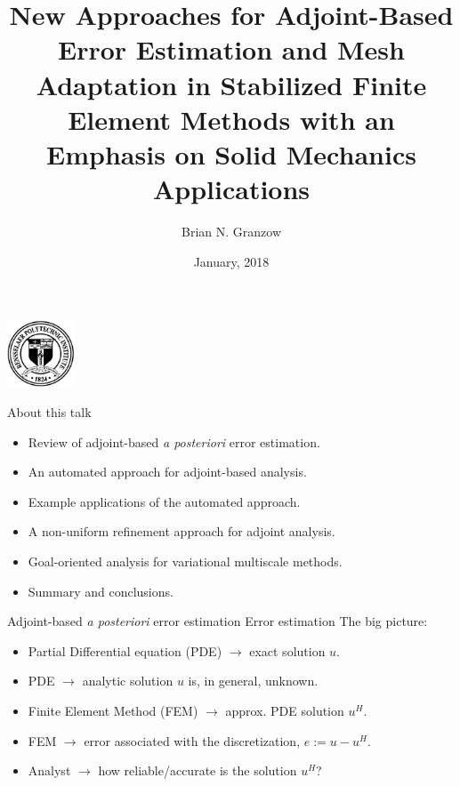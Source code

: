 \documentclass[fleqn]{beamer}
\title{New Approaches for Adjoint-Based
Error Estimation and Mesh Adaptation in
Stabilized Finite Element Methods with an
Emphasis on Solid Mechanics Applications}
\date{January, 2018}
\author{Brian N. Granzow}
\institute{
Mechanical Engineering\\
Rensselaer Polytechnic Instutite\\
Troy, NY 12180 USA}
\begin{document}
\beamertemplatenavigationsymbolsempty


\begin{frame}
\titlepage
\begin{center}
\includegraphics[width=0.15\textwidth]{../img/rpi_seal}
\end{center}
\end{frame}


\begin{frame}{About this talk}
\begin{itemize}
\item Review of adjoint-based \emph{a posteriori} error estimation.
\item An automated approach for adjoint-based analysis.
\item Example applications of the automated approach.
\item A non-uniform refinement approach for adjoint analysis.
\item Goal-oriented analysis for variational multiscale methods.
\item Summary and conclusions.
\end{itemize}
\end{frame}


\begin{frame}{Adjoint-based \emph{a posteriori} error estimation}
{Error estimation}
The big picture:
\begin{itemize}
\item Partial Differential equation (PDE) $\rightarrow$ exact solution $u$.
\item PDE $\rightarrow$ analytic solution $u$ is, in general, unknown.
\item Finite Element Method (FEM) $\rightarrow$ approx. PDE solution $u^H$.
\item FEM $\rightarrow$ error associated with the discretization, $e := u-u^H$.
\item Analyst $\rightarrow$ how reliable/accurate is the solution $u^H$?
\end{itemize}
\end{frame}
\end{document}
